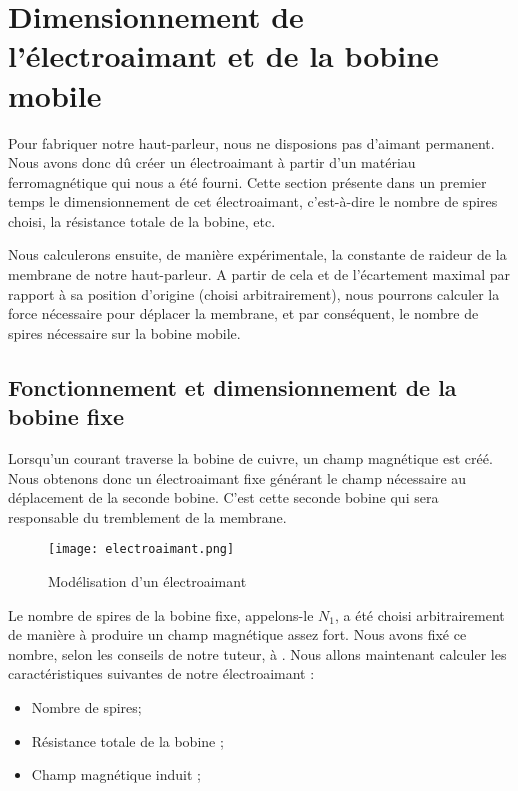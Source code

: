 

\section{Dimensionnement de l'électroaimant et de la bobine mobile}
Pour fabriquer notre haut-parleur, nous ne disposions pas d'aimant permanent. Nous avons donc
dû créer un électroaimant à partir d'un matériau ferromagnétique qui nous a été fourni.
Cette section présente dans un premier temps le dimensionnement de cet électroaimant, c'est-à-dire le
nombre de spires choisi, la résistance totale de la bobine, etc.

Nous calculerons ensuite, de manière expérimentale, la constante de raideur de la membrane de
notre haut-parleur. A partir de cela et de l'écartement maximal par rapport à sa position d'origine 
(choisi arbitrairement), 
nous pourrons calculer la force nécessaire pour déplacer la membrane, et par conséquent, le nombre
de spires nécessaire sur la bobine mobile.

\subsection{Fonctionnement et dimensionnement de la bobine fixe}
Lorsqu'un courant traverse la bobine de cuivre, un champ magnétique est créé.  Nous obtenons 
donc un électroaimant fixe générant le champ nécessaire au déplacement de la seconde bobine. 
C'est cette seconde bobine qui sera responsable du tremblement de la membrane.

\begin{figure}[ht!]
\centering
\texttt{[image: electroaimant.png]}
\caption{Modélisation d'un électroaimant}
\label{modélisation de l'électroaimant}
\end{figure}

Le nombre de spires de la bobine fixe, appelons-le $N_1$, a été choisi arbitrairement de manière à produire un
champ magnétique assez fort. Nous avons fixé ce nombre, selon les conseils de notre tuteur, à . 
Nous allons maintenant calculer les caractéristiques suivantes de notre électroaimant :

\begin{itemize}
	\item Nombre de spires;
	\item Résistance totale de la bobine ;
	\item Champ magnétique induit ;
\end{itemize}

